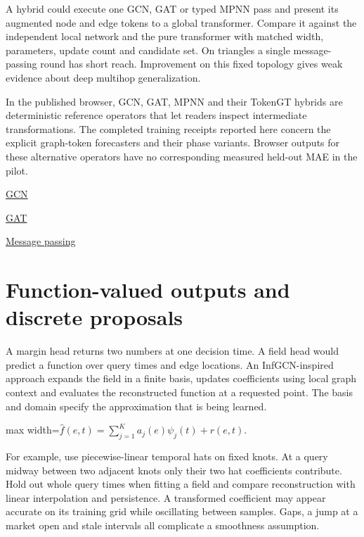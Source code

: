 \documentclass[11pt,oneside,openany]{book}
\begin{document}
A hybrid could execute one GCN, GAT or typed MPNN pass and present its augmented node and edge tokens to a global transformer. Compare it against the independent local network and the pure transformer with matched width, parameters, update count and candidate set. On triangles a single message-passing round has short reach. Improvement on this fixed topology gives weak evidence about deep multihop generalization.

In the published browser, GCN, GAT, MPNN and their TokenGT hybrids are deterministic reference operators that let readers inspect intermediate transformations. The completed training receipts reported here concern the explicit graph-token forecasters and their phase variants. Browser outputs for these alternative operators have no corresponding measured held-out MAE in the pilot.

{\small\sffamily\href{https://arxiv.org/abs/1609.02907}{GCN}\par}
{\small\sffamily\href{https://arxiv.org/abs/1710.10903}{GAT}\par}
{\small\sffamily\href{https://proceedings.mlr.press/v70/gilmer17a.html}{Message passing}\par}
\chapter{Function-valued outputs and discrete proposals}
A margin head returns two numbers at one decision time. A field head would predict a function over query times and edge locations. An InfGCN-inspired approach expands the field in a finite basis, updates coefficients using local graph context and evaluates the reconstructed function at a requested point. The basis and domain specify the approximation that is being learned.

\begin{center}\begin{adjustbox}{max width=\linewidth}$\displaystyle \widehat f(e,t)=\sum_{j=1}^{K}a_j(e)\psi_j(t)+r(e,t).$\end{adjustbox}\end{center}
For example, use piecewise-linear temporal hats on fixed knots. At a query midway between two adjacent knots only their two hat coefficients contribute. Hold out whole query times when fitting a field and compare reconstruction with linear interpolation and persistence. A transformed coefficient may appear accurate on its training grid while oscillating between samples. Gaps, a jump at a market open and stale intervals all complicate a smoothness assumption.
\end{document}
